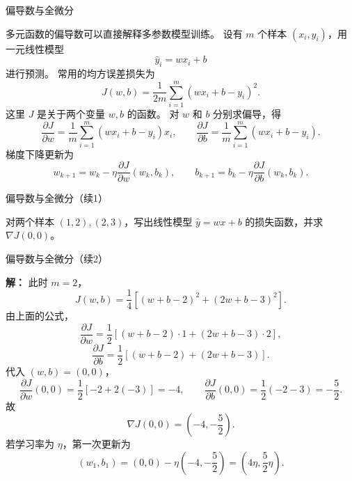 \documentclass[aspectratio=169,10pt,fontset=fandol]{ctexbeamer}
\renewenvironment{solution}{\par\noindent\textbf{解：}\quad}{\par}
\begin{document}
\begin{frame}[t,fragile]{偏导数与全微分}
\footnotesize
{\footnotesize
\begin{application}[偏导数在多参数机器学习模型中的应用]
	
	多元函数的偏导数可以直接解释多参数模型训练。 设有 $m$ 个样本 $(x_i,y_i)$，用一元线性模型
	\[
	\hat y_i=wx_i+b
	\]
	进行预测。 常用的均方误差损失为
	\[
	J(w,b)=\frac{1}{2m}\sum_{i=1}^{m}(wx_i+b-y_i)^2.
	\]
	这里 $J$ 是关于两个变量 $w,b$ 的函数。 对 $w$ 和 $b$ 分别求偏导，得
	\[
	\frac{\partial J}{\partial w}
	=\frac{1}{m}\sum_{i=1}^{m}(wx_i+b-y_i)x_i,
	\qquad
	\frac{\partial J}{\partial b}
	=\frac{1}{m}\sum_{i=1}^{m}(wx_i+b-y_i).
	\]
	梯度下降更新为
	\[
	w_{k+1}=w_k-\eta\frac{\partial J}{\partial w}(w_k,b_k),\qquad
	b_{k+1}=b_k-\eta\frac{\partial J}{\partial b}(w_k,b_k).
	\]
	

\end{application}
}
\end{frame}
\begin{frame}[t,fragile]{偏导数与全微分（续1）}
\footnotesize
{\footnotesize
\begin{application}[偏导数在多参数机器学习模型中的应用]
	\begin{example}
		对两个样本 $(1,2),(2,3)$，写出线性模型 $\hat y=wx+b$ 的损失函数，并求 $\nabla J(0,0)$。
	\end{example}
\end{application}
}
\end{frame}
\begin{frame}[t,fragile]{偏导数与全微分（续2）}
\footnotesize
{\footnotesize
\begin{application}[偏导数在多参数机器学习模型中的应用]

	\begin{solution}
		此时 $m=2$，
		\[
		J(w,b)=\frac14\left[(w+b-2)^2+(2w+b-3)^2\right].
		\]
		由上面的公式，
		\[
		\frac{\partial J}{\partial w}
		=\frac12\left[(w+b-2)\cdot1+(2w+b-3)\cdot2\right],
		\]
		\[
		\frac{\partial J}{\partial b}
		=\frac12\left[(w+b-2)+(2w+b-3)\right].
		\]
		代入 $(w,b)=(0,0)$，
		\[
		\frac{\partial J}{\partial w}(0,0)=\frac12[-2+2(-3)]=-4,\qquad
		\frac{\partial J}{\partial b}(0,0)=\frac12(-2-3)=-\frac52.
		\]
		故
		\[
		\nabla J(0,0)=\left(-4,-\frac52\right).
		\]
		若学习率为 $\eta$，第一次更新为
		\[
		(w_1,b_1)=\left(0,0\right)-\eta\left(-4,-\frac52\right)
		=\left(4\eta,\frac52\eta\right).
		\]
	\end{solution}
	
	
	
	
\end{application}
}
\end{frame}
\end{document}
